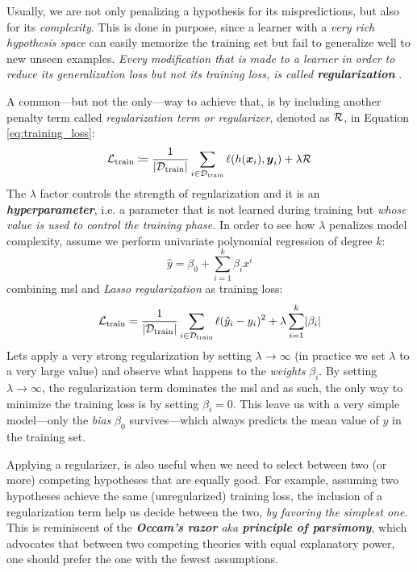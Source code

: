 Usually, we are not only penalizing a hypothesis for its mispredictions, but
also for its \emph{complexity}. This is done in purpose, since a learner with a
\emph{very rich hypothesis space} can easily memorize the training set but fail
to generalize well to new unseen examples. \emph{Every modification that is made
to a learner in order to reduce its generalization loss but not its training
loss, is called \textbf{regularization}} \parencite{deeplearning}.

A common---but not the only---way to achieve that, is by including another
penalty term called \emph{regularization term or
regularizer}, denoted as $\mathcal{R}$, in Equation
\ref{eq:training_loss}:
\begin{equation}
	\label{eq:regularization}
	\mathcal{L}_\text{train} \coloneqq \frac{1}{\lvert \mathcal{D}_\text{train} \rvert} \sum_{i \in \mathcal{D}_\text{train}}
	\ell(h(\boldsymbol{x}_i), \boldsymbol{y}_i)
	+
	\lambda \mathcal{R}
\end{equation}
The $\lambda$ factor controls the strength of regularization and it is an
\emph{\textbf{hyperparameter}}, i.e. a parameter that is
not learned during training but \emph{whose value is used to control the
training phase.} In order to see how $\lambda$ penalizes
model complexity, assume we perform univariate polynomial
regression of degree $k$:
\begin{equation}
	\hat{y} = \beta_0 + \sum_{i=1}^k \beta_i x^i
\end{equation}
combining \gls{msl} and \emph{Lasso
regularization} as training loss:
\begin{equation}
	\label{eq:lasso}
	\mathcal{L}_\text{train} = \frac{1}{\lvert \mathcal{D}_\text{train} \rvert} \sum_{i \in \mathcal{D}_\text{train}}
	\ell(\hat{y}_i - y_i)^2
	+
	\lambda \sum_{i=1}^k \lvert \beta_i \rvert
\end{equation}
Lets apply a very strong regularization by setting $\lambda \to \infty$ (in
practice we set $\lambda$ to a very large value) and observe what happens to the
\emph{weights} $\beta_i$. By setting $\lambda \to
\infty$, the regularization term dominates the \gls{msl} and as such, the only
way to minimize the training loss is by setting $\beta_i = 0$. This leave us
with a very simple model---only the \emph{bias} $\beta_0$
survives---which always predicts the mean value of $y$ in the training set.

Applying a regularizer, is also useful when we need to select
between two (or more) competing hypotheses that are equally good. For example,
assuming two hypotheses achieve the same (unregularized) training loss, the
inclusion of a regularization term help us decide between the two, \emph{by
favoring the simplest one}. This is reminiscent of the \emph{\textbf{Occam's
razor} aka \textbf{principle of parsimony}}, which advocates that between two competing theories with equal
explanatory power, one should prefer the one with the fewest assumptions.


